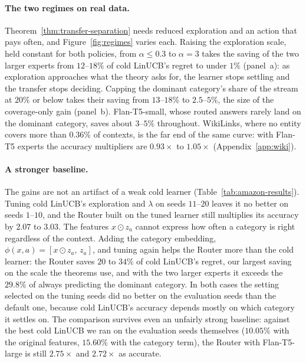 \documentclass[anon]{alt2027} %
\begin{document}
\paragraph{The two regimes on real data.}
Theorem~\ref{thm:transfer-separation} needs reduced exploration and an
action that pays often, and Figure~\ref{fig:regimes} varies each. Raising the
exploration scale, held constant for both policies, from $\alpha\le0.3$ to
$\alpha=3$ takes the saving of the two larger experts from $12$--$18\%$ of
cold LinUCB's regret to under $1\%$ (panel~a): as exploration approaches what
the theory asks for, the learner stops settling and the transfer stops
deciding. Capping the dominant category's share of the stream at $20\%$ or
below takes their saving from $13$--$18\%$ to $2.5$--$5\%$, the size of the
coverage-only gain (panel~b). Flan-T5-small, whose routed answers rarely land
on the dominant category, saves about $3$--$5\%$ throughout. WikiLinks, where
no entity covers more than $0.36\%$ of contexts, is the far end of the same
curve: with Flan-T5 experts the accuracy multipliers are $0.93\times$ to
$1.05\times$ (Appendix~\ref{app:wiki}).

\paragraph{A stronger baseline.}
The gains are not an artifact of a weak cold learner
(Table~\ref{tab:amazon-results}). Tuning cold LinUCB's exploration and
$\lambda$ on seeds $11$--$20$ leaves it no better on seeds $1$--$10$, and the
Router built on the tuned learner still multiplies its accuracy by $2.07$ to
$3.03$. The features $x\odot z_a$ cannot express how often a category is
right regardless of the context. Adding the category embedding,
$\phi(x,a)=[x\odot z_a,\,z_a]$, and tuning again helps the Router more than
the cold learner: the Router saves $20$ to $34\%$ of cold LinUCB's regret, our
largest saving on the scale the theorems use, and with the two larger
experts it exceeds the $29.8\%$ of always predicting the dominant category.
In both cases the setting selected on the tuning seeds did no better on the
evaluation seeds than the default one, because cold LinUCB's accuracy depends
mostly on which category it settles on. The comparison survives even an
unfairly strong baseline: against the best cold LinUCB we ran on the
evaluation seeds themselves ($10.05\%$ with the original features, $15.60\%$
with the category term), the Router with Flan-T5-large is still $2.75\times$
and $2.72\times$ as accurate.
\end{document}
